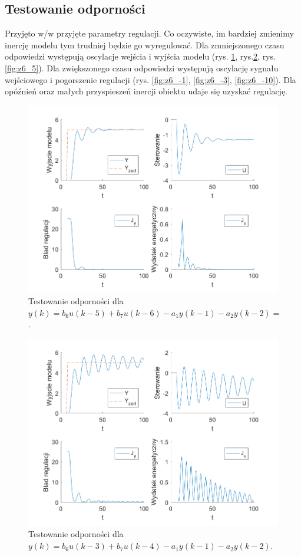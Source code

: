 \documentclass[a4paper, 10pt]{article}
\begin{document}
	\subsection{Testowanie odporności}
	Przyjęto w/w przyjęte parametry regulacji. Co oczywiste, im bardziej zmienimy inercję modelu tym trudniej będzie go wyregulować. Dla zmniejszonego czasu odpowiedzi występują oscylacje wejścia i wyjścia modelu (rys. \ref{fig:z6_1}, rys.\ref{fig:z6_3}, rys.\ref{fig:z6_5}). Dla zwiększonego czasu odpowiedzi występują oscylację sygnału wejściowego i pogorszenie regulacji (rys. \ref{fig:z6_-1}, \ref{fig:z6_-3}, \ref{fig:z6_-10}). Dla opóźnień oraz małych przyspieszeń inercji obiektu udaje się uzyskać regulację.
	\begin{figure}[H]
	\centering
	\includegraphics[width=0.9\linewidth]{z6_1}
	\caption{Testowanie odporności dla  $y(k) = b_6u(k-5)+b_7u(k-6)-a_1y(k-1)-a_2y(k-2)=$.}
	\label{fig:z6_1}
	\end{figure}
	
	\begin{figure}[H]
		\centering
		\includegraphics[width=0.9\linewidth]{z6_3}
		\caption{Testowanie odporności dla  $y(k) = b_6u(k-3)+b_7u(k-4)-a_1y(k-1)-a_2y(k-2)$.}
		\label{fig:z6_3}
		\end{figure}
		
\end{document}
